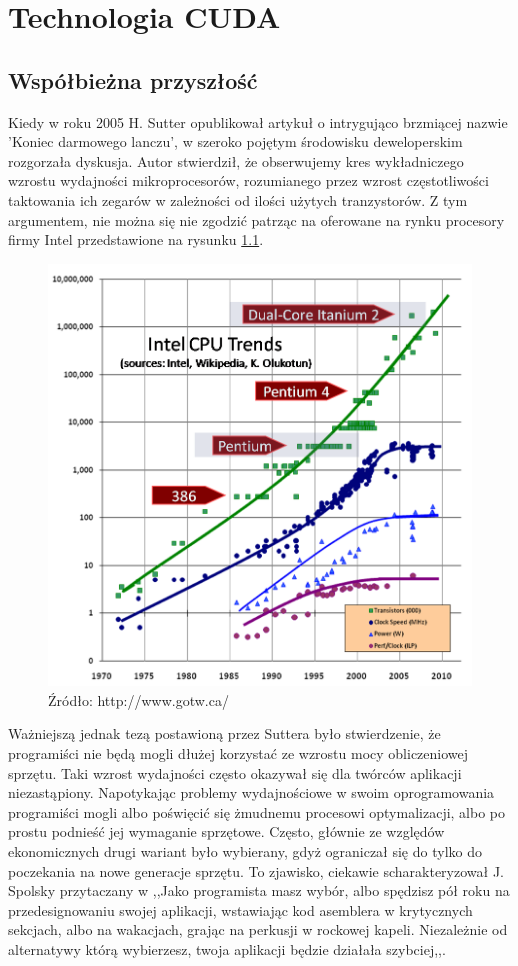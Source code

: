 \chapter{Technologia CUDA}
\section{Współbieżna przyszłość}
Kiedy w roku 2005 H. Sutter \cite{lunch} opublikował artykuł o intrygująco 
brzmiącej nazwie 'Koniec darmowego lanczu', w szeroko pojętym środowisku 
deweloperskim rozgorzała dyskusja. Autor stwierdził, że obserwujemy kres 
wykładniczego wzrostu wydajności mikroprocesorów, rozumianego przez wzrost 
częstotliwości taktowania ich zegarów w zależności od ilości użytych
tranzystorów. Z tym argumentem, nie można się nie zgodzić patrząc na
oferowane na rynku procesory firmy Intel przedstawione na rysunku \ref{proce}.

\begin{figure}[ht]\label{proce}
\centering
\includegraphics[scale=1.0]{images/CPU.png}
\caption{Źródło: http://www.gotw.ca/}
\end{figure}

Ważniejszą jednak tezą postawioną przez Suttera było stwierdzenie, że
programiści nie będą mogli dłużej korzystać ze wzrostu mocy obliczeniowej
sprzętu. Taki wzrost wydajności często okazywał się dla twórców aplikacji
niezastąpiony. Napotykając problemy wydajnościowe w swoim oprogramowania
programiści mogli albo poświęcić się żmudnemu procesowi optymalizacji, albo
po prostu podnieść jej wymaganie sprzętowe. Często, głównie ze względów
ekonomicznych drugi wariant było wybierany, gdyż ograniczał się do tylko do
poczekania na nowe generacje sprzętu. To zjawisko, ciekawie scharakteryzował J.
Spolsky przytaczany w \cite{nolunch} ,,Jako programista masz wybór, albo
spędzisz pół roku na przedesignowaniu swojej aplikacji, wstawiając kod asemblera
w krytycznych sekcjach, albo na wakacjach, grając na perkusji w rockowej kapeli.
Niezależnie od alternatywy którą wybierzesz, twoja aplikacji będzie działała
szybciej,,.

